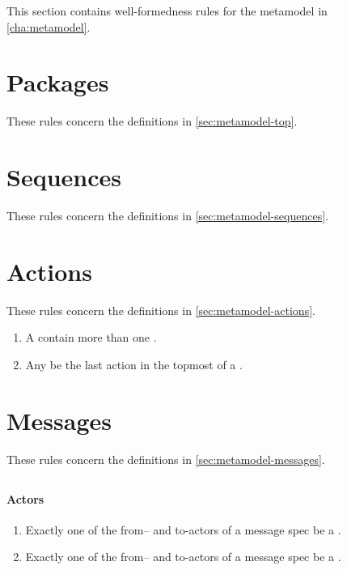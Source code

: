 
This section contains well-formedness rules for the metamodel in
\cref{cha:metamodel}.


\section{Packages}\label{sec:wf-top}

These rules concern the definitions in \cref{sec:metamodel-top}.

\section{Sequences}\label{sec:wf-sequences}

These rules concern the definitions in \cref{sec:metamodel-sequences}.

\section{Actions}\label{sec:wf-actions}

These rules concern the definitions in \cref{sec:metamodel-actions}.

\begin{enumerate}
\item
	A \msequence{} \rfcmustnot{} contain more than one \mfinalaction.
\item
	Any \mfinalaction{} \rfcmust{} be the last action in the topmost
	\msubsequence{} of a \msequence.
\end{enumerate}

\section{Messages}\label{sec:wf-messages}

These rules concern the definitions in \cref{sec:metamodel-messages}.

\subsection{\mmessagespec}

\paragraph{Actors}

\begin{enumerate}
\item
	Exactly one of the from-- and to-actors of a message spec \rfcmust{} 
	be a \mtarget.
\item
	Exactly one of the from-- and to-actors of a message spec \rfcmust{} 
	be a \mworld.
\end{enumerate}

